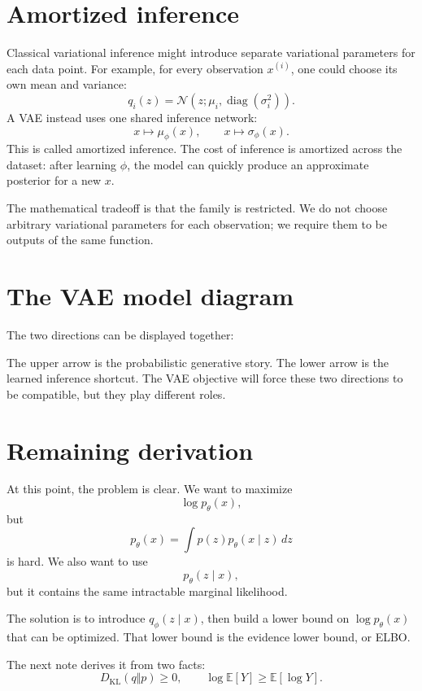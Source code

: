 \section{Amortized inference}

Classical variational inference might introduce separate variational parameters for each data point.  For example, for every observation \(x^{(i)}\), one could choose its own mean and variance:
\[
  q_i(z)=\mathcal N(z;\mu_i,\operatorname{diag}(\sigma_i^2)).
\]
A VAE instead uses one shared inference network:
\[
  x\longmapsto \mu_\phi(x),\qquad x\longmapsto \sigma_\phi(x).
\]
This is called amortized inference.  The cost of inference is amortized across the dataset: after learning \(\phi\), the model can quickly produce an approximate posterior for a new \(x\).

The mathematical tradeoff is that the family is restricted.  We do not choose arbitrary variational parameters for each observation; we require them to be outputs of the same function.

\section{The VAE model diagram}

The two directions can be displayed together:

\begin{center}
\end{center}

The upper arrow is the probabilistic generative story.  The lower arrow is the learned inference shortcut.  The VAE objective will force these two directions to be compatible, but they play different roles.

\section{Remaining derivation}

At this point, the problem is clear.  We want to maximize
\[
  \log p_\theta(x),
\]
but
\[
  p_\theta(x)=\int p(z)p_\theta(x\mid z)\,dz
\]
is hard.  We also want to use
\[
  p_\theta(z\mid x),
\]
but it contains the same intractable marginal likelihood.

The solution is to introduce \(q_\phi(z\mid x)\), then build a lower bound on \(\log p_\theta(x)\) that can be optimized.  That lower bound is the evidence lower bound, or ELBO.

The next note derives it from two facts:
\[
  D_{\mathrm{KL}}(q\Vert p)\ge0,
  \qquad
  \log\mathbb E[Y]\ge\mathbb E[\log Y].
\]

